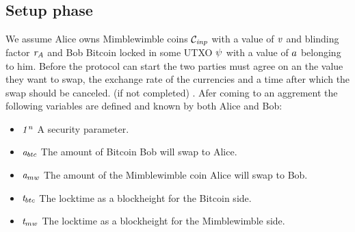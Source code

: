\subsection{Setup phase}

We assume Alice owns Mimblewimble coins $\mathcal{C}_{\mathit{inp}}$ with a value of $\mathit{v}$ and blinding factor $\mathit{r}_{\mathit{A}}$ and Bob
Bitcoin locked in some UTXO $\psi$ with a value of $a$ belonging to him.
Before the protocol can start the two parties must agree on an the value they want to swap, the exchange rate of the
currencies and a time after which the swap should be canceled. (if not completed) .
Afer coming to an aggrement the following variables are defined and known by both Alice and Bob:
\begin{itemize}
    \item $\mathit{1^n}$ A security parameter.
    \item $\mathit{a}_{btc}$ The amount of Bitcoin Bob will swap to Alice.
    \item $\mathit{a}_{mw}$ The amount of the Mimblewimble coin Alice will swap to Bob.
    \item $\mathit{t}_{btc}$ The locktime as a blockheight for the Bitcoin side.
    \item $\mathit{t}_{mw}$ The locktime as a blockheight for the Mimblewimble side.
\end{itemize}

